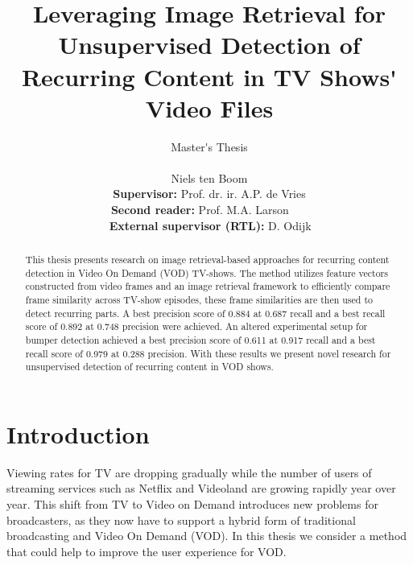 \documentclass{report}
\begin{document}
\title{Leveraging Image Retrieval for Unsupervised Detection of Recurring Content in TV Shows\'{} Video Files}
\author{Master\'{}s Thesis\\ \\ Niels ten Boom \\ [1cm]{\small \textbf{Supervisor:} Prof. dr. ir. A.P. de Vries} \\ {\small \textbf{Second reader:} Prof. M.A. Larson \,\,\,\,\,\,\,\,} \\ {\small \textbf{\,External supervisor (RTL):} D. Odijk}}

\date{\vspace{-3ex}}

\maketitle
\newpage

\begin{abstract}
This thesis presents research on image retrieval-based approaches for recurring content detection in Video On Demand (VOD) TV-shows. The method utilizes feature vectors constructed from video frames and an image retrieval framework to efficiently compare frame similarity across TV-show episodes, these frame similarities are then used to detect recurring parts. A best precision score of 0.884 at 0.687 recall and a best recall score of 0.892 at 0.748 precision were achieved. An altered experimental setup for bumper detection achieved a best precision score of 0.611 at 0.917 recall and a best recall score of 0.979 at 0.288 precision. With these results we present novel research for unsupervised detection of recurring content in VOD shows.
\end{abstract}
\newpage

\tableofcontents
\newpage

\chapter{Introduction} \label{introduction}
Viewing rates for TV are dropping gradually while the number of users of streaming services such as Netflix and Videoland are growing rapidly year over year. This shift from TV to Video on Demand introduces new problems for broadcasters, as they now have to support a hybrid form of traditional broadcasting and Video On Demand (VOD). In this thesis we consider a method that could help to improve the user experience for VOD.
\end{document}
